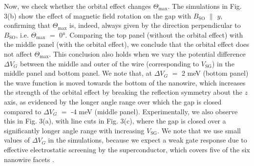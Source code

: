 Now, we check whether the orbital effect changes $\Theta_{\mathrm{max}}$. The simulations in Fig. 3(b) show the effect of magnetic field rotation on the gap with $B_{\mathrm{SO}}$ $\parallel$ $y$, confirming that $\Theta_{\mathrm{max}}$ is, indeed, always given by the direction perpendicular to $B_{\mathrm{SO}}$, i.e. $\Theta_{\mathrm{max}}$ $=$ \ang{0}. Comparing the top panel (without the orbital effect) with the middle panel (with the orbital effect), we conclude that the orbital effect does not affect $\Theta_{\mathrm{max}}$. This conclusion also holds when we vary the potential difference $\Delta V_G$ between the middle and outer of the wire (corresponding to $V_{\mathrm{SG}}$) in the middle panel and bottom panel. We note that, at $\Delta V_G$ $=$ 2 meV (bottom panel) the wave function is moved towards the bottom of the nanowire, which increases the strength of the orbital effect by breaking the reflection symmetry about the $z$ axis, as evidenced by the longer angle range over which the gap is closed compared to $\Delta V_G$ $=$ -4 meV (middle panel). Experimentally, we also observe this in Fig. 3(a), with line cuts in Fig. 3(c), where the gap is closed over a significantly longer angle range with increasing $V_{\mathrm{SG}}$. We note that we use small values of $\Delta V_G$ in the simulations, because we expect a weak gate response due to effective electrostatic screening by the superconductor, which covers five of the six nanowire facets \cite{BalSc}.
\\ \indent
